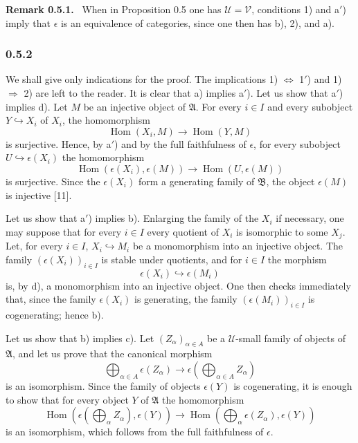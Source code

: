 \documentclass[11pt]{article}
\newcommand{\U}{\mathcal{U}}
\newcommand{\V}{\mathcal{V}}
\newcommand{\A}{\mathfrak{A}}
\newcommand{\B}{\mathfrak{B}}
\newcommand{\Hom}{\operatorname{Hom}}
\newenvironment{remarktext}[1]{\par\medskip\noindent\textbf{#1.}\ }{\par\medskip}
\begin{document}
\begin{remarktext}{Remark 0.5.1}
When in Proposition 0.5 one has $\U=\V$, conditions 1) and a$'$) imply that $\epsilon$ is an equivalence of categories, since one then has b), 2), and a).
\end{remarktext}

\subsubsection*{0.5.2}
We shall give only indications for the proof. The implications 1) $\Leftrightarrow$ 1$'$) and 1) $\Rightarrow$ 2) are left to the reader. It is clear that a) implies a$'$). Let us show that a$'$) implies d). Let $M$ be an injective object of $\A$. For every $i\in I$ and every subobject $Y\hookrightarrow X_i$ of $X_i$, the homomorphism
\[
\Hom(X_i,M)\longrightarrow \Hom(Y,M)
\]
is surjective. Hence, by a$'$) and by the full faithfulness of $\epsilon$, for every subobject $U\hookrightarrow \epsilon(X_i)$ the homomorphism
\[
\Hom(\epsilon(X_i),\epsilon(M))\longrightarrow \Hom(U,\epsilon(M))
\]
is surjective. Since the $\epsilon(X_i)$ form a generating family of $\B$, the object $\epsilon(M)$ is injective [11].

Let us show that a$'$) implies b). Enlarging the family of the $X_i$ if necessary, one may suppose that for every $i\in I$ every quotient of $X_i$ is isomorphic to some $X_j$. Let, for every $i\in I$, $X_i\hookrightarrow M_i$ be a monomorphism into an injective object. The family $(\epsilon(X_i))_{i\in I}$ is stable under quotients, and for $i\in I$ the morphism
\[
\epsilon(X_i)\hookrightarrow \epsilon(M_i)
\]
is, by d), a monomorphism into an injective object. One then checks immediately that, since the family $\epsilon(X_i)$ is generating, the family $(\epsilon(M_i))_{i\in I}$ is cogenerating; hence b).

Let us show that b) implies c). Let $(Z_\alpha)_{\alpha\in A}$ be a $\U$-small family of objects of $\A$, and let us prove that the canonical morphism
\[
\bigoplus_{\alpha\in A}\epsilon(Z_\alpha)\longrightarrow \epsilon\left(\bigoplus_{\alpha\in A}Z_\alpha\right)
\]
is an isomorphism. Since the family of objects $\epsilon(Y)$ is cogenerating, it is enough to show that for every object $Y$ of $\A$ the homomorphism
\[
\Hom\left(\epsilon\left(\bigoplus_\alpha Z_\alpha\right),\epsilon(Y)\right)
\longrightarrow
\Hom\left(\bigoplus_\alpha \epsilon(Z_\alpha),\epsilon(Y)\right)
\]
is an isomorphism, which follows from the full faithfulness of $\epsilon$.
\end{document}
